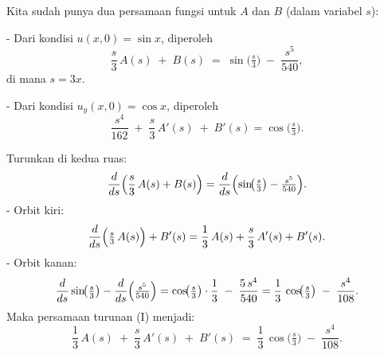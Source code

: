 \documentclass[a4paper]{article}
\theoremstyle{definition}
\begin{document}
\begin{enumerate}
\begin{enumerate}
   Kita sudah punya dua persamaan fungsi untuk \(A\) dan \(B\) (dalam variabel \(s\)):

   - Dari kondisi \(u(x,0)=\sin x\), diperoleh
     \[
     \frac{s}{3}\,A(s) \;+\; B(s) \;=\; \sin\!\bigl(\tfrac{s}{3}\bigr) \;-\; \frac{s^{5}}{540},
     \tag{I}
     \]
     di mana \(s=3x\).

   - Dari kondisi \(u_{y}(x,0)=\cos x\), diperoleh
     \[
     \frac{s^{4}}{162} \;+\; \frac{s}{3}\,A'(s) \;+\; B'(s)
     = \cos\!\bigl(\tfrac{s}{3}\bigr).
     \tag{II}
     \]

      Turunkan di kedua ruas:
      \[
      \frac{d}{ds}\Bigl(\frac{s}{3}\,A(s) + B(s)\Bigr)
      = \frac{d}{ds}\Bigl(\sin\!\bigl(\tfrac{s}{3}\bigr) - \tfrac{s^{5}}{540}\Bigr).
      \]
      - Orbit kiri: 
        \[
        \frac{d}{ds}\Bigl(\tfrac{s}{3}\,A(s)\Bigr) 
        + B'(s)
        = \frac{1}{3}\,A(s) + \frac{s}{3}\,A'(s) + B'(s).
        \]
      - Orbit kanan:
        \[
        \frac{d}{ds}\sin\!\bigl(\tfrac{s}{3}\bigr) 
        - \frac{d}{ds}\Bigl(\tfrac{s^{5}}{540}\Bigr) 
        = \cos\!\bigl(\tfrac{s}{3}\bigr)\cdot\frac{1}{3} 
        \;-\; \frac{5\,s^{4}}{540} 
        = \frac{1}{3}\,\cos\!\bigl(\tfrac{s}{3}\bigr)
          \;-\; \frac{s^{4}}{108}.
        \]
      Maka persamaan turunan (I) menjadi:
      \[
      \frac{1}{3}\,A(s) 
      \;+\; \frac{s}{3}\,A'(s)
      \;+\; B'(s)
      \;=\; \frac{1}{3}\,\cos\!\bigl(\tfrac{s}{3}\bigr)
            \;-\; \frac{s^{4}}{108}.
      \tag{III}
      \]


\end{enumerate}
\end{enumerate}
\end{document}
